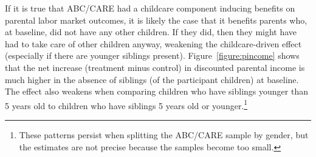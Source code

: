 If it is true that ABC/CARE had a childcare component inducing benefits on parental labor market outcomes, it is likely the case that it benefits parents who, at baseline, did not have any other children. If they did, then they might have had to take care of other children anyway, weakening the childcare-driven effect (especially if there are younger siblings present). Figure~\ref{figure:pincome} shows that the net increase (treatment minus control) in discounted parental income is much higher in the absence of siblings (of the participant children) at baseline. The effect also weakens when comparing children who have siblings younger than 5 years old to children who have siblings 5 years old or younger.\footnote{These patterns persist when splitting the ABC/CARE sample by gender, but the estimates are not precise because the samples become too small.}

